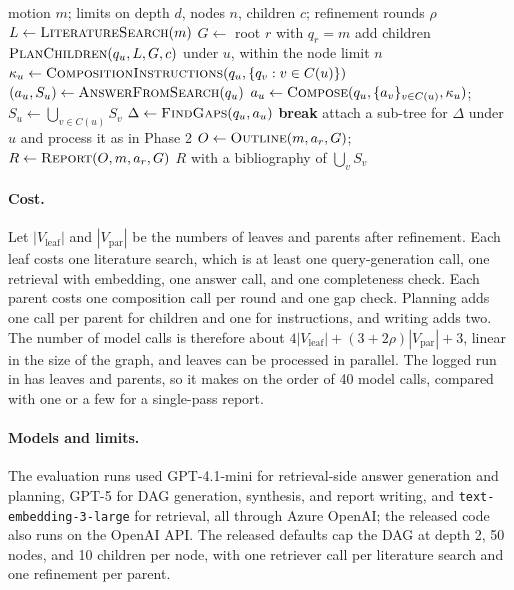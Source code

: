 \begin{algorithm}[t]
\caption{\sys{}}
\label{alg:pipeline}
\begin{algorithmic}[1]
\Require motion $m$; limits on depth $d$, nodes $n$, children $c$; refinement rounds $\rho$
\State $L \gets \textsc{LiteratureSearch}(m)$ 
\State $G \gets$ root $r$ with $q_r = m$
 
    \State add children $\textsc{PlanChildren}(q_u, L, G, c)$ under $u$, within the node limit $n$
  \EndFor
\EndFor
{} $\kappa_u \gets \textsc{CompositionInstructions}(q_u, \{q_v : v \in C(u)\})$ \EndFor
{} 
    \State $(a_u, S_u) \gets \textsc{AnswerFromSearch}(q_u)$
  \Else
      \State $a_u \gets \textsc{Compose}(q_u, \{a_v\}_{v \in C(u)}, \kappa_u)$; \quad $S_u \gets \bigcup_{v \in C(u)} S_v$
      \State $\Delta \gets \textsc{FindGaps}(q_u, a_u)$
       \textbf{break} \EndIf
      \State attach a sub-tree for $\Delta$ under $u$ and process it as in Phase 2
    \EndFor
  \EndIf
\EndFor
\State $O \gets \textsc{Outline}(m, a_r, G)$; \quad $R \gets \textsc{Report}(O, m, a_r, G)$ 
\State \Return $R$ with a bibliography of $\bigcup_v S_v$
\end{algorithmic}
\end{algorithm}

\paragraph{Cost.}
Let $|V_\text{leaf}|$ and $|V_\text{par}|$ be the numbers of leaves and parents after refinement. Each leaf costs one literature search, which is at least one query-generation call, one retrieval with embedding, one answer call, and one completeness check. Each parent costs one composition call per round and one gap check. Planning adds one call per parent for children and one for instructions, and writing adds two. The number of model calls is therefore about $4|V_\text{leaf}| + (3 + 2\rho)|V_\text{par}| + 3$, linear in the size of the graph, and leaves can be processed in parallel. The logged run in  has \dagLeaves{} leaves and \dagParents{} parents, so it makes on the order of 40 model calls, compared with one or a few for a single-pass report.

\paragraph{Models and limits.}
The evaluation runs used GPT-4.1-mini for retrieval-side answer generation and planning, GPT-5 for DAG generation, synthesis, and report writing, and \texttt{text-embedding-3-large} for retrieval, all through Azure OpenAI; the released code also runs on the OpenAI API. The released defaults cap the DAG at depth 2, 50 nodes, and 10 children per node, with one retriever call per literature search and one refinement per parent.
